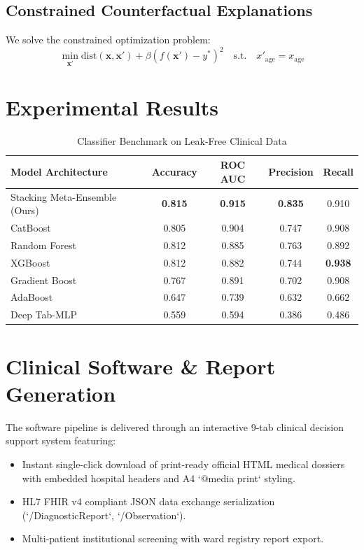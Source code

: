 \documentclass[10pt,journal,compsoc]{IEEEtran}
\begin{document}
\subsection{Constrained Counterfactual Explanations}
We solve the constrained optimization problem:
\begin{equation}
\min_{\mathbf{x}'} \text{dist}(\mathbf{x}, \mathbf{x}') + \beta (f(\mathbf{x}') - y^*)^2 \quad \text{s.t.} \quad x'_{\text{age}} = x_{\text{age}}
\end{equation}

\section{Experimental Results}

\begin{table}[h]
\caption{Classifier Benchmark on Leak-Free Clinical Data}
\centering
\begin{tabular}{lcccc}
\toprule
\textbf{Model Architecture} & \textbf{Accuracy} & \textbf{ROC AUC} & \textbf{Precision} & \textbf{Recall} \\
\midrule
Stacking Meta-Ensemble (Ours) & \textbf{0.815} & \textbf{0.915} & \textbf{0.835} & 0.910 \\
CatBoost & 0.805 & 0.904 & 0.747 & 0.908 \\
Random Forest & 0.812 & 0.885 & 0.763 & 0.892 \\
XGBoost & 0.812 & 0.882 & 0.744 & \textbf{0.938} \\
Gradient Boost & 0.767 & 0.891 & 0.702 & 0.908 \\
AdaBoost & 0.647 & 0.739 & 0.632 & 0.662 \\
Deep Tab-MLP & 0.559 & 0.594 & 0.386 & 0.486 \\
\bottomrule
\end{tabular}
\end{table}

\section{Clinical Software \& Report Generation}
The software pipeline is delivered through an interactive 9-tab clinical decision support system featuring:
\begin{itemize}
    \item Instant single-click download of print-ready official HTML medical dossiers with embedded hospital headers and A4 `@media print` styling.
    \item HL7 FHIR v4 compliant JSON data exchange serialization (`/DiagnosticReport`, `/Observation`).
    \item Multi-patient institutional screening with ward registry report export.
\end{itemize}
\end{document}
